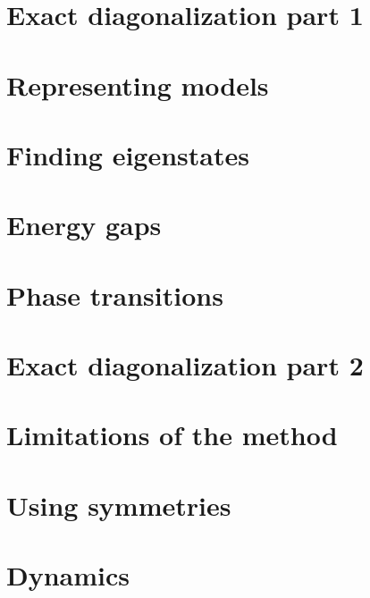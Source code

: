 \documentclass{book}
\theoremstyle{definition}
\begin{document}
%
%
%
%

\newpage

\section{Exact diagonalization part 1}

\section{Representing models}

\section{Finding eigenstates}

\section{Energy gaps}

\section{Phase transitions}
\newpage




\section{Exact diagonalization part 2}


\section{Limitations of the method}

\section{Using symmetries}

\section{Dynamics}
\end{document}
